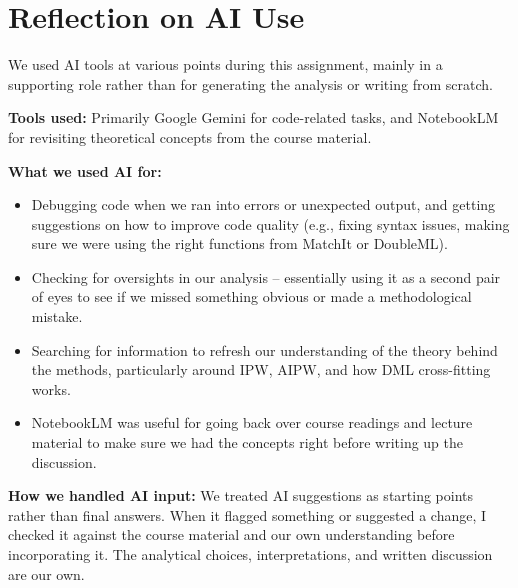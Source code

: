 \documentclass[
  letterpaper,
  DIV=11,
  numbers=noendperiod]{scrartcl}
\providecommand{\tightlist}{%
  \setlength{\itemsep}{0pt}\setlength{\parskip}{0pt}}
\begin{document}
\section{Reflection on AI Use}\label{reflection-on-ai-use}

We used AI tools at various points during this assignment, mainly in a
supporting role rather than for generating the analysis or writing from
scratch.

\textbf{Tools used:} Primarily Google Gemini for code-related tasks, and
NotebookLM for revisiting theoretical concepts from the course material.

\textbf{What we used AI for:}

\begin{itemize}
\tightlist
\item
  Debugging code when we ran into errors or unexpected output, and
  getting suggestions on how to improve code quality (e.g., fixing
  syntax issues, making sure we were using the right functions from
  MatchIt or DoubleML).
\item
  Checking for oversights in our analysis -- essentially using it as a
  second pair of eyes to see if we missed something obvious or made a
  methodological mistake.
\item
  Searching for information to refresh our understanding of the theory
  behind the methods, particularly around IPW, AIPW, and how DML
  cross-fitting works.
\item
  NotebookLM was useful for going back over course readings and lecture
  material to make sure we had the concepts right before writing up the
  discussion.
\end{itemize}

\textbf{How we handled AI input:} We treated AI suggestions as starting
points rather than final answers. When it flagged something or suggested
a change, I checked it against the course material and our own
understanding before incorporating it. The analytical choices,
interpretations, and written discussion are our own.
\end{document}
